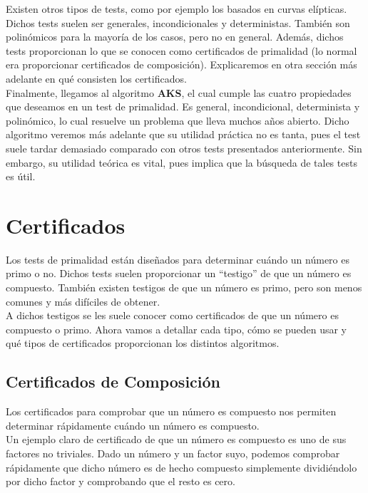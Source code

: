 Existen otros tipos de tests, como por ejemplo los basados en curvas elípticas. Dichos tests suelen ser generales, incondicionales y deterministas. También son polinómicos para la mayoría de los casos, pero no en general. Además, dichos tests proporcionan lo que se conocen como certificados de primalidad (lo normal era proporcionar certificados de composición). Explicaremos en otra sección más adelante en qué consisten los certificados.\\

Finalmente, llegamos al algoritmo \textbf{AKS}, el cual cumple las cuatro propiedades que deseamos en un test de primalidad. Es general, incondicional, determinista y polinómico, lo cual resuelve un problema que lleva muchos años abierto. Dicho algoritmo veremos más adelante que su utilidad práctica no es tanta, pues el test suele tardar demasiado comparado con otros tests presentados anteriormente. Sin embargo, su utilidad teórica es vital, pues implica que la búsqueda de tales tests es útil.

\section{Certificados}

Los tests de primalidad están diseñados para determinar cuándo un número es primo o no. Dichos tests suelen proporcionar un ``testigo'' de que un número es compuesto. También existen testigos de que un número es primo, pero son menos comunes y más difíciles de obtener.\\

A dichos testigos se les suele conocer como certificados de que un número es compuesto o primo. Ahora vamos a detallar cada tipo, cómo se pueden usar y qué tipos de certificados proporcionan los distintos algoritmos.

\subsection{Certificados de Composición}

Los certificados para comprobar que un número es compuesto nos permiten determinar rápidamente cuándo un número es compuesto.\\

Un ejemplo claro de certificado de que un número es compuesto es uno de sus factores no triviales. Dado un número y un factor suyo, podemos comprobar rápidamente que dicho número es de hecho compuesto simplemente dividiéndolo por dicho factor y comprobando que el resto es cero.\\

